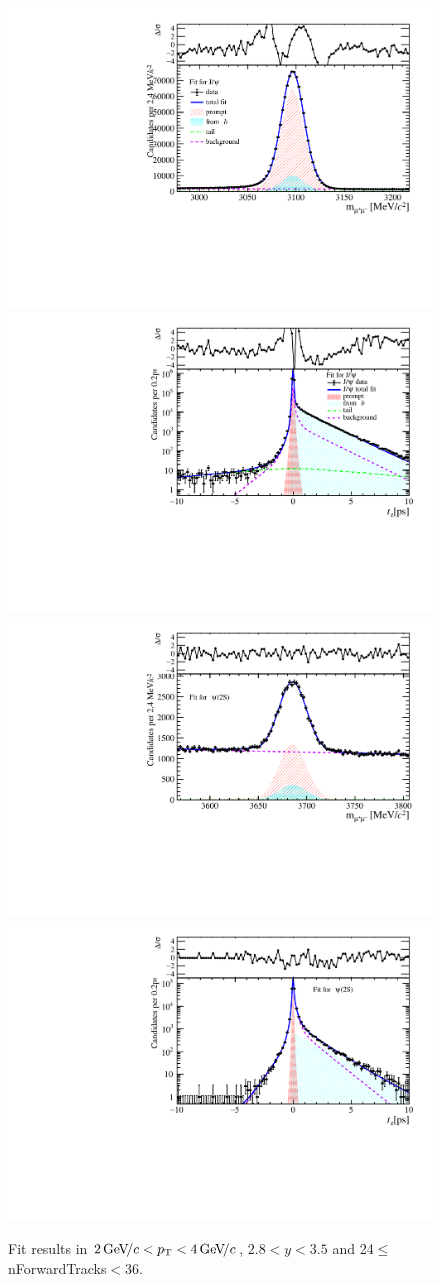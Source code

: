 \begin{figure}[H]
\begin{center}
\includegraphics[width=0.47\linewidth]{pdf/Jpsi/drawmassF/n3y2pt2.pdf}
\includegraphics[width=0.47\linewidth]{pdf/Jpsi/2DFitF/n3y2pt2.pdf}
\vspace*{-0.5cm}
\includegraphics[width=0.47\linewidth]{pdf/Psi2S/drawmassF/n3y2pt2.pdf}
\includegraphics[width=0.47\linewidth]{pdf/Psi2S/2DFitF/n3y2pt2.pdf}
\vspace*{-0.5cm}
\end{center}
\caption{Fit results in $2\text{\,Ge\kern -0.1em V\!/}c<p_{\mathrm{T}}<4\text{\,Ge\kern -0.1em V\!/}c$, $2.8<y<3.5$ and 24$\leq$nForwardTracks$<$36.}
\label{Fitn3y2pt2}
\end{figure}
